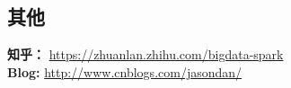 \documentclass[UTF8,margin,line]{res}
\begin{document}
\begin{resume}
\section{\sc 其他}
\textbf{知乎：} \url{https://zhuanlan.zhihu.com/bigdata-spark} \\
\textbf{Blog: } \url{http://www.cnblogs.com/jasondan/} \\

\end{resume}
\end{document}
